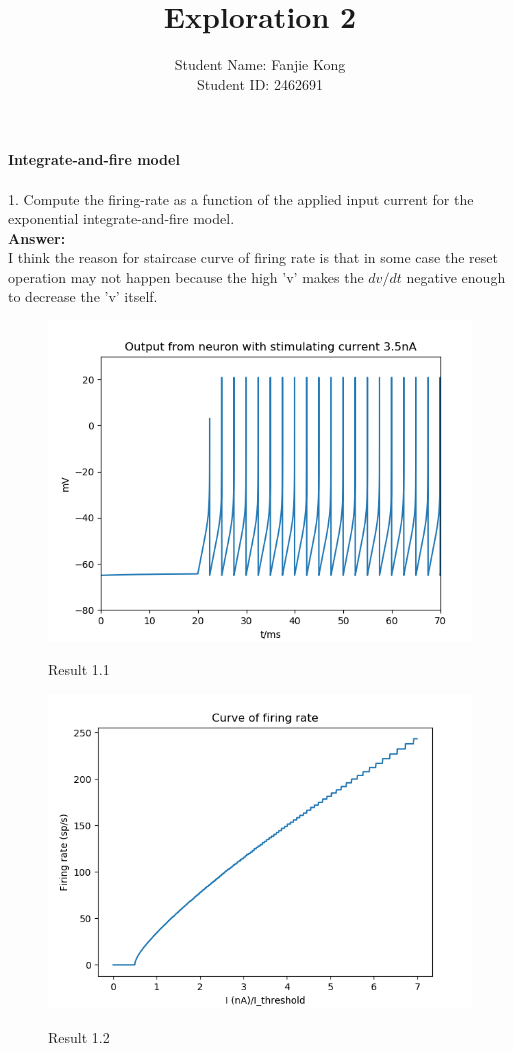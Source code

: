 \documentclass[12pt]{article}
\title{Exploration 2}
\author{Student Name: Fanjie Kong
\\
Student ID: 2462691 }
\begin{document}
\maketitle
\newpage
\textbf{Integrate-and-fire model}
\\\\

1. Compute the firing-rate as a function of the applied input current for the exponential integrate-and-fire model.
\\

\textbf{Answer:} 
\\

I think the reason for staircase curve of firing rate is that in some case the reset operation may not happen because the high 'v' makes the $dv/dt$ negative enough to decrease the 'v' itself. 

 \begin{figure}[H]
  \centering
  \includegraphics[width=.8\textwidth]{h2_p1_p1.png} %
  \label{img} %
  \caption{Result 1.1}
\end{figure}

 \begin{figure}[H]
  \centering
  \includegraphics[width=.8\textwidth]{h2_p1_2.png} %
  \label{img} %
  \caption{Result 1.2}
\end{figure}
 
\end{document}
